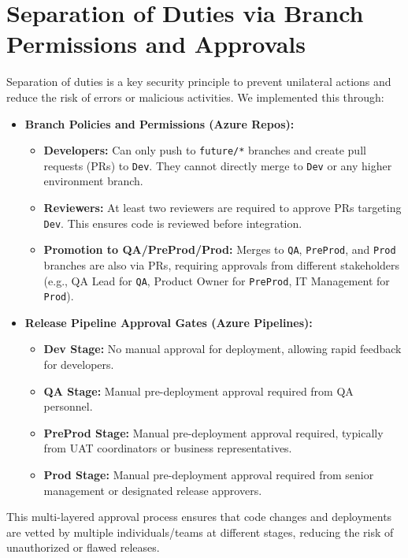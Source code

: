 \section{Separation of Duties via Branch Permissions and Approvals}
\label{sec:SeparationOfDuties}

Separation of duties is a key security principle to prevent unilateral actions and reduce the risk of errors or malicious activities. We implemented this through:

\begin{itemize}
    \item \textbf{Branch Policies and Permissions (Azure Repos):}
    \begin{itemize}
        \item \textbf{Developers:} Can only push to \texttt{future/*} branches and create pull requests (PRs) to \texttt{Dev}. They cannot directly merge to \texttt{Dev} or any higher environment branch.
        \item \textbf{Reviewers:} At least two reviewers are required to approve PRs targeting \texttt{Dev}. This ensures code is reviewed before integration.
        \item \textbf{Promotion to QA/PreProd/Prod:} Merges to \texttt{QA}, \texttt{PreProd}, and \texttt{Prod} branches are also via PRs, requiring approvals from different stakeholders (e.g., QA Lead for \texttt{QA}, Product Owner for \texttt{PreProd}, IT Management for \texttt{Prod}).
    \end{itemize}
    \item \textbf{Release Pipeline Approval Gates (Azure Pipelines):}
    \begin{itemize}
        \item \textbf{Dev Stage:} No manual approval for deployment, allowing rapid feedback for developers.
        \item \textbf{QA Stage:} Manual pre-deployment approval required from QA personnel.
        \item \textbf{PreProd Stage:} Manual pre-deployment approval required, typically from UAT coordinators or business representatives.
        \item \textbf{Prod Stage:} Manual pre-deployment approval required from senior management or designated release approvers.
    \end{itemize}
\end{itemize}

This multi-layered approval process ensures that code changes and deployments are vetted by multiple individuals/teams at different stages, reducing the risk of unauthorized or flawed releases.

